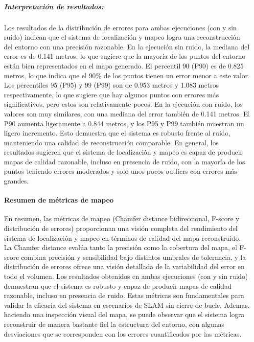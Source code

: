 \documentclass[12pt, a4paper, twoside]{article}
\begin{document}
\subparagraph{Interpretación de resultados:}
Los resultados de la distribución de errores para ambas ejecuciones (con y sin ruido) indican que el sistema de localización y mapeo logra una reconstrucción del entorno con una precisión razonable.
En la ejecución sin ruido, la mediana del error es de 0.141 metros, lo que sugiere que la mayoría de los puntos del entorno están bien representados en el mapa generado.
El percentil 90 (P90) es de 0.825 metros, lo que indica que el 90\% de los puntos tienen un error menor a este valor.
Los percentiles 95 (P95) y 99 (P99) son de 0.953 metros y 1.083 metros respectivamente, lo que sugiere que hay algunos puntos con errores más significativos, pero estos son relativamente pocos.
En la ejecución con ruido, los valores son muy similares, con una mediana del error también de 0.141 metros.
El P90 aumenta ligeramente a 0.844 metros, y los P95 y P99 también muestran un ligero incremento.
Esto demuestra que el sistema es robusto frente al ruido, manteniendo una calidad de reconstrucción comparable.
En general, los resultados sugieren que el sistema de localización y mapeo es capaz de producir mapas de calidad razonable, incluso en presencia de ruido, con la mayoría de los puntos teniendo errores moderados 
y solo unos pocos outliers con errores más grandes.

\paragraph{Resumen de métricas de mapeo}
En resumen, las métricas de mapeo (Chamfer distance bidireccional, F-score y distribución de errores) proporcionan una visión completa del rendimiento del sistema de localización y mapeo en términos de calidad del mapa reconstruido.
La Chamfer distance evalúa tanto la precisión como la cobertura del mapa, el F-score combina precisión y sensibilidad bajo distintos umbrales de tolerancia, y la distribución de errores ofrece una visión detallada de la variabilidad del error en todo el volumen.
Los resultados obtenidos en ambas ejecuciones (con y sin ruido) demuestran que el sistema es robusto y capaz de producir mapas de calidad razonable, incluso en presencia de ruido.
Estas métricas son fundamentales para validar la eficacia del sistema en escenarios de SLAM sin cierre de bucle. Ademas, haciendo una inspección visual del mapa, se puede observar que el sistema logra reconstruir de manera bastante fiel la estructura del entorno,
con algunas desviaciones que se corresponden con los errores cuantificados por las métricas.
\end{document}
